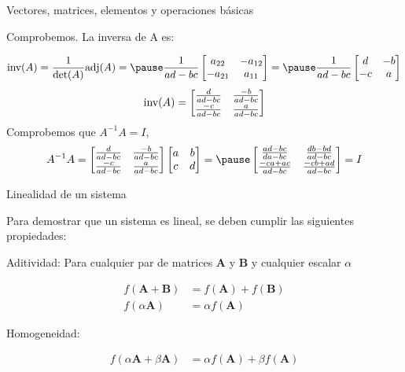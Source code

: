 \documentclass[aspectratio=169]{beamer}
\begin{document}
\begin{frame}
 {Vectores, matrices, elementos y operaciones b\'asicas}

 {\color{black}
 Comprobemos. La inversa de A es:
 
 \begin{equation*}
  \textnormal{inv}{(A)} =
  \frac{1}{\textnormal{det}(A)}
  \textnormal{adj}(A) = \pause
    \frac{1}{ad-bc}
      \begin{bmatrix}
   a_{22} & -a_{12} \\
  -a_{21} & a_{11}
  \end{bmatrix} = \pause
  \frac{1}{ad-bc}
  \begin{bmatrix}
   d & -b \\
  -c & a
  \end{bmatrix}
  \end{equation*} \pause
  \begin{equation*}
  \textnormal{inv}{(A)} =
      \begin{bmatrix}
    \frac{d}{ad-bc} &  \frac{-b}{ad-bc} \\
    \frac{-c}{ad-bc} &  \frac{a}{ad-bc}
  \end{bmatrix}
  \end{equation*} \pause
Comprobemos que $A^{-1}A=I$, \pause
\begin{equation*}
 A^{-1} A =       \begin{bmatrix}
    \frac{d}{ad-bc} &  \frac{-b}{ad-bc} \\
    \frac{-c}{ad-bc} &  \frac{a}{ad-bc}
  \end{bmatrix} 
      \begin{bmatrix}
   a & b \\
   c & d
  \end{bmatrix} = \pause  
\begin{bmatrix}
    \frac{ad-bc}{da-bc} &  \frac{db-bd}{ad-bc} \\
    \frac{-ca+ac}{ad-bc} &  \frac{-cb+ad}{ad-bc}
  \end{bmatrix}  = I 
\end{equation*}

 }
\end{frame}

 
\begin{frame}
 {Linealidad de un sistema}
 
{\color{black} 
 Para demostrar que un sistema es lineal, se deben cumplir las siguientes propiedades:

 Aditividad: \pause Para cualquier par de matrices {\bf A} y {\bf B} y cualquier escalar $\alpha$

\begin{align*}
f(\mathbf{A} + \mathbf{B}) &= f(\mathbf{A}) + f(\mathbf{B}) \\
f(\alpha \mathbf{A}) &= \alpha f(\mathbf{A})
\end{align*} \pause
 
Homogeneidad: \pause

\begin{align*}
f(\alpha \mathbf{A} + \beta \mathbf{A}) &= \alpha f(\mathbf{A}) + \beta f(\mathbf{A})
\end{align*}
}

\end{frame}
\end{document}
